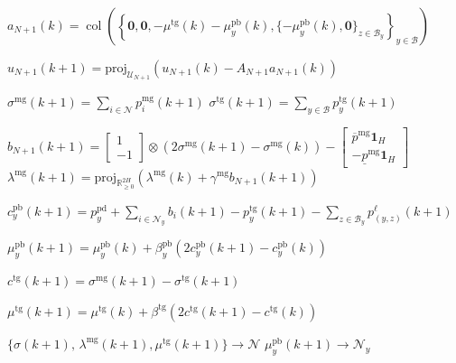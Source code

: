 \documentclass[10pt]{article}
\newtheorem{definitiox	n}{Definition}{\it}{}
\newcommand{\mc}{\mathcal}
\newcommand{\bb}{\mathbb}
\newcommand{\R}{\bb R}
\newcommand{\proj}{\mathrm{proj}}
\newcommand{\col}{\operatorname{col}}
\newcommand{\0}{\mathbf{0}}
\newcommand{\1}{\mathbf{1}}
\begin{document}
\begin{algorithm}[H]
\begin{algorithmic}[1]
\EndDual

\EndFor

\DSO{ }

\Primal{}
\State
$a_{N+1}(k) = \col \left( 
	\left\{
	\0,\0,-\mu^{\text{tg}}(k) - \mu_y^{\text{pb}}(k), 
	\{ -\mu_y^{\text{pb}}(k), \0 \}_{z \in \mc B_y}
	\right\}_{y \in \mc B}
	\right)$

\State 	$u_{N+1}(k+1) = \proj_{\mc U_{N+1}}  \left( u_{N+1}(k) - A_{N+1} a_{N+1}(k) \right)$
\EndPrimal

\Agg{}
\State
$ \sigma^{\text{mg}}(k+1) = \sum_{i \in \mc N} p_i^{\text{mg}}(k+1) $
\State
$\sigma^{\text{tg}}(k+1) = \sum_{y \in \mc B} p_y^{\text{tg}}(k+1)$
\EndAgg

\Dual{}
\State
$b_{N+1}(k+1	) = 
	\left[
	\begin{smallmatrix}
	1\\
	- 1 
	\end{smallmatrix}
	\right] \otimes (2 \sigma^{\text{mg}}(k+1)- \sigma^{\text{mg}}(k)) 
	-
	\left[
	\begin{smallmatrix}
	\overline{p}^{\mathrm{mg}}\1_{H} \\
	-     \underline{p}^{\mathrm{mg}} \1_{H}
	\end{smallmatrix} 
	\right]  $
	\State
$\lambda^{\text{mg}}(k+1) = \textstyle
	\proj_{\R^{2 H}_{\geq 0}}\left( 
	\lambda^{\text{mg}}(k) + \gamma^{\text{mg}} b_{N+1}(k+1)
	 \right)$

\ForAll{buses $ y \in \mc B$}

\State
$c^{\text{pb}}_y(k+1)   = p_y^{\text{pd}} + \sum_{i \in \mc N_y} b_i(k+1)- p^{\text{tg}}_y(k+1) - \sum_{z \in \mc B_y} p^\ell_{(y,z)} (k+1)$

\State
$\mu_y^{\text{pb}}(k+1) = \mu_y^{\text{pb}}(k) + \beta^{\text{pb}}_y (2 c^{\text{pb}}_y(k+1)- c^{\text{pb}}_y(k))$
\EndFor

\State
$c^{\text{tg}}(k+1) = \sigma^{\text{mg}}
	(k+1)- \sigma^{\text{tg}}(k+1)$

\State
$\mu^{\text{tg}}(k+1) = \mu^{\text{tg}}(k) + \beta^{\text{tg}} (2c^{\text{tg}}(k+1)-c^{\text{tg}}(k))$
\EndDual	

\Comm{ }
\State
$ \{ \sigma(k+1), \, \lambda^{\text{mg}}(k+1), \mu^{\text{tg}}(k+1) \} 
	\longrightarrow  \mc N$
\ForAll{buses $ y \in \mc B$}
\State
$\mu^{\text{pb}}_y(k+1)\longrightarrow \mc N_y$
\EndFor

\EndComm

\EndDSO	

\EndIUC	

\end{algorithmic}
\end{algorithm}
\end{document}
